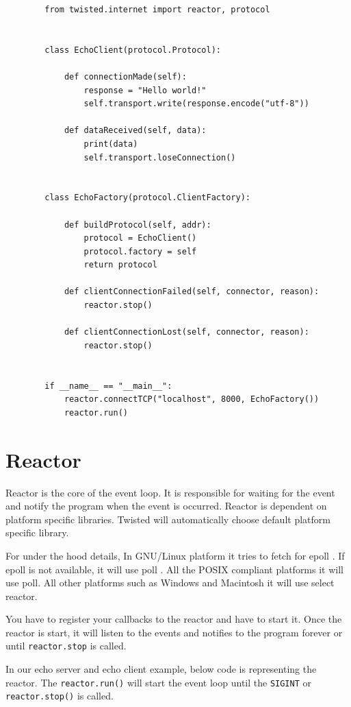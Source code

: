 \documentclass{article}
\begin{document}
      \begin{verbatim}
        from twisted.internet import reactor, protocol


        class EchoClient(protocol.Protocol):

            def connectionMade(self):
                response = "Hello world!"
                self.transport.write(response.encode("utf-8"))

            def dataReceived(self, data):
                print(data)
                self.transport.loseConnection()


        class EchoFactory(protocol.ClientFactory):

            def buildProtocol(self, addr):
                protocol = EchoClient()
                protocol.factory = self
                return protocol

            def clientConnectionFailed(self, connector, reason):
                reactor.stop()

            def clientConnectionLost(self, connector, reason):
                reactor.stop()


        if __name__ == "__main__":
            reactor.connectTCP("localhost", 8000, EchoFactory())
            reactor.run()
      \end{verbatim}

  \section{Reactor}
    Reactor is the core of the event loop. It is responsible for waiting for
    the event and notify the program when the event is occurred. Reactor is
    dependent on platform specific libraries. Twisted will automatically choose
    default platform specific library.

    For under the hood details, In GNU/Linux platform it tries to fetch for
    epoll \cite{epoll}.  If epoll \cite{epoll} is not available, it will use
    poll \cite{poll}. All the POSIX compliant platforms it will use poll. All
    other platforms such as Windows and Macintosh it will use select reactor.

    You have to register your callbacks to the reactor and have to start it.
    Once the reactor is start, it will listen to the events and notifies to the
    program forever or until \texttt{reactor.stop} is called.

    In our echo server and echo client example, below code is representing the
    reactor. The \texttt{reactor.run()} will start the event loop until the
    \texttt{SIGINT} or \texttt{reactor.stop()} is called.
\end{document}
